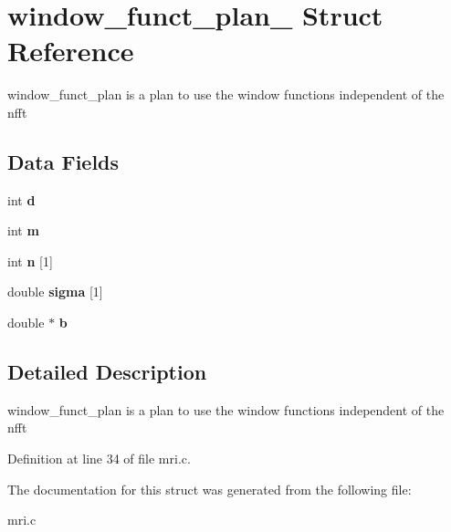 \hypertarget{structwindow__funct__plan__}{\section{window\-\_\-funct\-\_\-plan\-\_\- Struct Reference}
\label{structwindow__funct__plan__}
}


window\-\_\-funct\-\_\-plan is a plan to use the window functions independent of the nfft  


\subsection*{Data Fields}
\begin{DoxyCompactItemize}
\item 
\hypertarget{structwindow__funct__plan___ab5d5f5263d52634062dbdf5e2e89e51a}{int {\bfseries d}}\label{structwindow__funct__plan___ab5d5f5263d52634062dbdf5e2e89e51a}

\item 
\hypertarget{structwindow__funct__plan___abcd107b125dea15da3651fe055f3550b}{int {\bfseries m}}\label{structwindow__funct__plan___abcd107b125dea15da3651fe055f3550b}

\item 
\hypertarget{structwindow__funct__plan___af51cd5627d15508b5a6f9071cb5c05c8}{int {\bfseries n} \mbox{[}1\mbox{]}}\label{structwindow__funct__plan___af51cd5627d15508b5a6f9071cb5c05c8}

\item 
\hypertarget{structwindow__funct__plan___a8ccb145d4e8fb4e395533f85b35bf0d7}{double {\bfseries sigma} \mbox{[}1\mbox{]}}\label{structwindow__funct__plan___a8ccb145d4e8fb4e395533f85b35bf0d7}

\item 
\hypertarget{structwindow__funct__plan___a327636fa511ff5be5dac22db28903c44}{double $\ast$ {\bfseries b}}\label{structwindow__funct__plan___a327636fa511ff5be5dac22db28903c44}

\end{DoxyCompactItemize}


\subsection{Detailed Description}
window\-\_\-funct\-\_\-plan is a plan to use the window functions independent of the nfft 

Definition at line 34 of file mri.\-c.



The documentation for this struct was generated from the following file\-:\begin{DoxyCompactItemize}
\item 
mri.\-c\end{DoxyCompactItemize}
